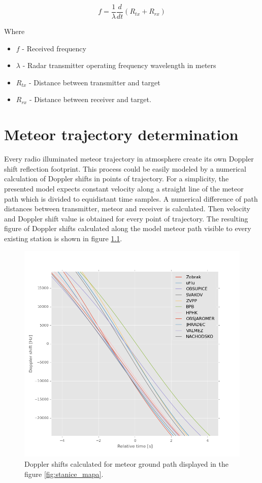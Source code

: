 \documentclass[twoside]{ctuthesis}
\theoremstyle{plain}
\theoremstyle{definition}
\theoremstyle{note}
\begin{document}
\begin{equation}
f = \frac{1}{\lambda} \frac{d}{dt} \left( R_{tx} + R_{rx} \right)
\label{bistatic_doppler}
\end{equation}

Where 
\begin{itemize}
\item $f$ - Received frequency
\item $\lambda$ - Radar transmitter operating frequency wavelength in meters
\item $R_{tx}$ - Distance between transmitter and target
\item $R_{rx}$ - Distance between receiver and target.
\end{itemize}

\chapter{Meteor trajectory determination}

Every radio illuminated meteor trajectory in atmosphere create its own Doppler shift reflection footprint.  This process could be easily modeled by a numerical calculation of Doppler shifts in points of trajectory. For a simplicity, the presented model expects constant velocity along a straight line of the meteor path which is divided to equidistant time samples. A numerical difference of path distances between transmitter, meteor and receiver is calculated. Then velocity and Doppler shift value is obtained for every point of trajectory. 
The resulting figure of Doppler shifts calculated along the model meteor path visible to every existing station is shown in figure \ref{fig:dopplers}. 


\begin{figure}
 \begin{center}
 \includegraphics[width=\textwidth]{./img/Meteor_dopplers.png}
 \caption{Doppler shifts calculated for meteor ground path displayed in the figure \ref{fig:stanice_mapa}.}
  \label{fig:dopplers} 
 \end{center}
\end{figure}
\end{document}
